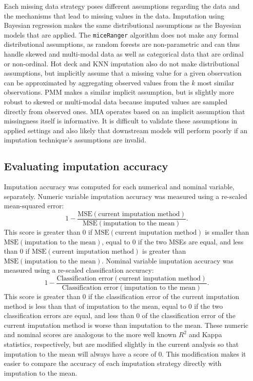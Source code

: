 \documentclass{article}
\begin{document}
Each missing data strategy poses different assumptions regarding the
data and the mechanisms that lead to missing values in the data.
Imputation using Bayesian regression makes the same distributional
assumptions as the Bayesian models that are applied. The
\texttt{miceRanger} algorithm does not make any formal distributional
assumptions, as random forests are non-parametric and can thus handle
skewed and multi-modal data as well as categorical data that are ordinal
or non-ordinal. Hot deck and KNN imputation also do not make
distributional assumptions, but implicitly assume that a missing value
for a given observation can be approximated by aggregating observed
values from the \(k\) most similar observations. PMM makes a similar
implicit assumption, but is slightly more robust to skewed or
multi-modal data because imputed values are sampled directly from
observed ones. MIA operates based on an implicit assumption that
missingness itself is informative. It is difficult to validate these
assumptions in applied settings and also likely that downstream models
will perform poorly if an imputation technique's assumptions are
invalid.

\hypertarget{evaluating-imputation-accuracy}{%
\subsection{Evaluating imputation
accuracy}\label{evaluating-imputation-accuracy}}

\label{subsec:imputation_accuracy}

Imputation accuracy was computed for each numerical and nominal
variable, separately. Numeric variable imputation accuracy was measured
using a re-scaled mean-squared error:
\[1 - \frac{\textrm{MSE}(\textrm{current imputation method})}{\textrm{MSE}(\textrm{imputation to the mean})}.\]
This score is greater than 0 if
\(\textrm{MSE}(\textrm{current imputation method})\) is smaller than
\(\textrm{MSE}(\textrm{imputation to the mean})\), equal to 0 if the two
MSEs are equal, and less than 0 if
\(\textrm{MSE}(\textrm{current imputation method})\) is greater than
\(\textrm{MSE}(\textrm{imputation to the mean})\). Nominal variable
imputation accuracy was measured using a re-scaled classification
accuracy:
\[1 - \frac{\textrm{Classification error}(\textrm{current imputation method})}{\textrm{Classification error}(\textrm{imputation to the mean})}.\]
This score is greater than 0 if the classification error of the current
imputation method is less than that of imputation to the mean, equal to
0 if the two classification errors are equal, and less than 0 of the
classification error of the current imputation method is worse than
imputation to the mean. These numeric and nominal scores are analogous
to the more well known \(R^2\) and Kappa statistics, respectively, but
are modified slightly in the current analysis so that imputation to the
mean will always have a score of 0. This modification makes it easier to
compare the accuracy of each imputation strategy directly with
imputation to the mean.
\end{document}
